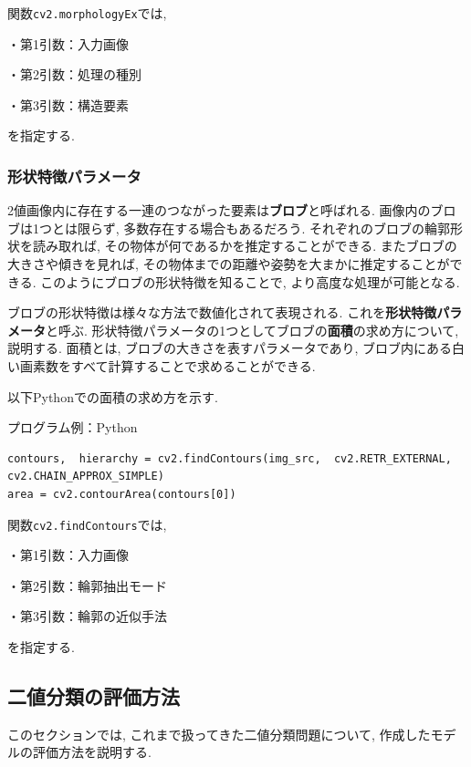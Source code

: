 \documentclass[dvipdfmx]{jsarticle}
\begin{document}
関数\verb+cv2.morphologyEx+では, 


・第1引数：入力画像

・第2引数：処理の種別

・第3引数：構造要素


を指定する.


\subsubsection{形状特徴パラメータ}
2値画像内に存在する一連のつながった要素は\textbf{ブロブ}と呼ばれる.
画像内のブロブは1つとは限らず, 多数存在する場合もあるだろう.
それぞれのブロブの輪郭形状を読み取れば, その物体が何であるかを推定することができる.
またブロブの大きさや傾きを見れば, その物体までの距離や姿勢を大まかに推定することができる.
このようにブロブの形状特徴を知ることで, より高度な処理が可能となる.

ブロブの形状特徴は様々な方法で数値化されて表現される.
これを\textbf{形状特徴パラメータ}と呼ぶ.
形状特徴パラメータの1つとしてブロブの\textbf{面積}の求め方について, 説明する.
面積とは, ブロブの大きさを表すパラメータであり, ブロブ内にある白い画素数をすべて計算することで求めることができる.

以下Pythonでの面積の求め方を示す.

プログラム例：Python
\begin{lstlisting}
contours,  hierarchy = cv2.findContours(img_src,  cv2.RETR_EXTERNAL,  cv2.CHAIN_APPROX_SIMPLE)
area = cv2.contourArea(contours[0])
\end{lstlisting}

関数\verb|cv2.findContours|では, 


・第1引数：入力画像

・第2引数：輪郭抽出モード

・第3引数：輪郭の近似手法


を指定する.






\subsection{二値分類の評価方法}
このセクションでは, これまで扱ってきた二値分類問題について, 作成したモデルの評価方法を説明する.
\end{document}
